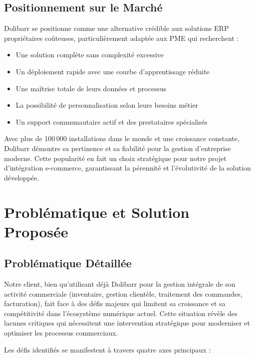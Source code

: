 \documentclass[12pt,a4paper]{report}
\begin{document}
\subsection{Positionnement sur le Marché}
Dolibarr se positionne comme une alternative crédible aux solutions ERP propriétaires coûteuses, particulièrement adaptée aux PME qui recherchent :

\begin{itemize}
    \item Une solution complète sans complexité excessive
    \item Un déploiement rapide avec une courbe d'apprentissage réduite
    \item Une maîtrise totale de leurs données et processus
    \item La possibilité de personnalisation selon leurs besoins métier
    \item Un support communautaire actif et des prestataires spécialisés
\end{itemize}

Avec plus de 100\,000 installations dans le monde et une croissance constante, Dolibarr démontre sa pertinence et sa fiabilité pour la gestion d'entreprise moderne. Cette popularité en fait un choix stratégique pour notre projet d'intégration e-commerce, garantissant la pérennité et l'évolutivité de la solution développée.












\section{Problématique et Solution Proposée}
\subsection{Problématique Détaillée}
Notre client, bien qu'utilisant déjà Dolibarr pour la gestion intégrale de son activité commerciale (inventaire, gestion clientèle, traitement des commandes, facturation), fait face à des défis majeurs qui limitent sa croissance et sa compétitivité dans l'écosystème numérique actuel. Cette situation révèle des lacunes critiques qui nécessitent une intervention stratégique pour moderniser et optimiser les processus commerciaux.

Les défis identifiés se manifestent à travers quatre axes principaux :
\end{document}
